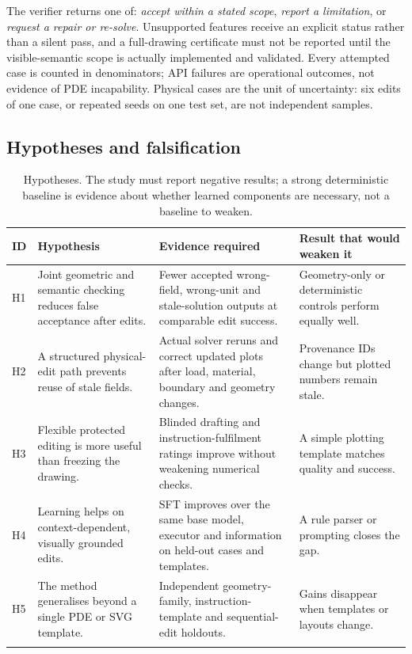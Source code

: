 \documentclass[11pt,a4paper]{article}
\begin{document}
The verifier returns one of: \emph{accept within a stated scope}, \emph{report a limitation}, or \emph{request a repair or re-solve}. Unsupported features receive an explicit status rather than a silent pass, and a full-drawing certificate must not be reported until the visible-semantic scope is actually implemented and validated. Every attempted case is counted in denominators; API failures are operational outcomes, not evidence of PDE incapability. Physical cases are the unit of uncertainty: six edits of one case, or repeated seeds on one test set, are not independent samples.

\subsection{Hypotheses and falsification}

\begin{longtable}{L{0.6cm} L{4.3cm} L{5.4cm} L{4.6cm}}
\toprule
ID & Hypothesis & Evidence required & Result that would weaken it \\
\midrule
H1 & Joint geometric and semantic checking reduces false acceptance after edits. & Fewer accepted wrong-field, wrong-unit and stale-solution outputs at comparable edit success. & Geometry-only or deterministic controls perform equally well. \\
H2 & A structured physical-edit path prevents reuse of stale fields. & Actual solver reruns and correct updated plots after load, material, boundary and geometry changes. & Provenance IDs change but plotted numbers remain stale. \\
H3 & Flexible protected editing is more useful than freezing the drawing. & Blinded drafting and instruction-fulfilment ratings improve without weakening numerical checks. & A simple plotting template matches quality and success. \\
H4 & Learning helps on context-dependent, visually grounded edits. & SFT improves over the same base model, executor and information on held-out cases and templates. & A rule parser or prompting closes the gap. \\
H5 & The method generalises beyond a single PDE or SVG template. & Independent geometry-family, instruction-template and sequential-edit holdouts. & Gains disappear when templates or layouts change. \\
\bottomrule
\caption[]{Hypotheses. The study must report negative results; a strong deterministic baseline is evidence about whether learned components are necessary, not a baseline to weaken.}
\end{longtable}
\end{document}
